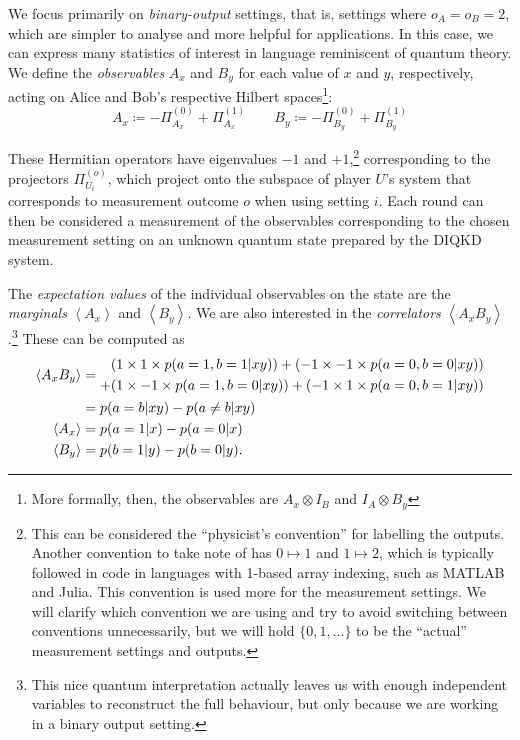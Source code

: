 \documentclass[10pt, a4paper]{article}
\numberwithin{equation}{section} %
\theoremstyle{definition}
\theoremstyle{plain}
\newcommand{\?}{\mathrel{?}} %
\newcommand{\angleb}[1]{\left\langle #1 \right\rangle} %
\begin{document}
  We focus primarily on \emph{binary-output} settings, that is, settings where \(o_A = o_B = 2\), which are simpler to analyse and more helpful for applications. In this case, we can express many statistics of interest in language reminiscent of quantum theory. We define the \emph{observables} \(A_x\) and \(B_y\) for each value of \(x\) and \(y\), respectively, acting on Alice and Bob's respective Hilbert spaces\footnote{More formally, then, the observables are \(A_x \otimes I_B\) and \(I_A \otimes B_y\)}:
  \[ A_x \coloneqq -\Pi_{A_x}^{(0)} + \Pi_{A_x}^{(1)} \qquad B_y \coloneqq -\Pi_{B_y}^{(0)} + \Pi_{B_y}^{(1)} \]

  These Hermitian operators have eigenvalues \(-1\) and \(+1\),\footnote{This can be considered the ``physicist's convention'' for labelling the outputs. Another convention to take note of has \(0 \mapsto 1\) and \(1 \mapsto 2\), which is typically followed in code in languages with 1-based array indexing, such as MATLAB and Julia. This convention is used more for the measurement settings. We will clarify which convention we are using and try to avoid switching between conventions unnecessarily, but we will hold \(\{0,1,\ldots\}\) to be the ``actual'' measurement settings and outputs.} corresponding to the projectors \(\Pi_{U_i}^{(o)}\), which project onto the subspace of player \(U\)'s system that corresponds to measurement outcome \(o\) when using setting \(i\). Each round can then be considered a measurement of the observables corresponding to the chosen measurement setting on an unknown quantum state prepared by the DIQKD system.

  The \emph{expectation values} of the individual observables on the state are the \emph{marginals} \(\angleb{A_x}\) and \(\angleb{B_y}\). We are also interested in the \emph{correlators} \(\angleb{A_x B_y}\).\footnote{This nice quantum interpretation actually leaves us with enough independent variables to reconstruct the full behaviour, but only because we are working in a binary output setting.} These can be computed as
  \begin{align}
    \angleb{A_x B_y} &= \begin{aligned}[c]
      (1 \times 1 \times p(a=1,b=1|xy)) + (-1 \times -1 \times p(a=0,b=0|xy)) \\
      + (1 \times -1 \times p(a=1,b=0|xy)) + (-1 \times 1 \times p(a=0,b=1|xy))
    \end{aligned} \notag \\
                     &= p(a=b|xy) - p(a\neq b|xy) \\
      \angleb{A_x} &= p(a=1|x) - p(a=0|x) \\
      \angleb{B_y} &= p(b=1|y) - p(b=0|y).
    \end{align}
\end{document}
